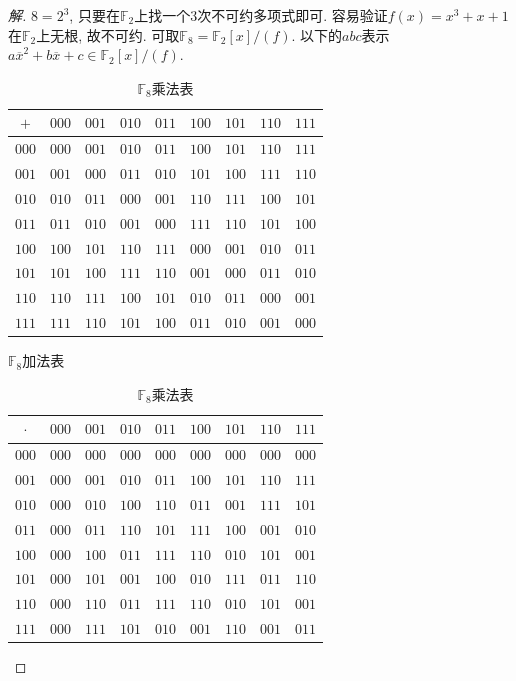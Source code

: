 \documentclass[12pt, a4paper, fontset=windows]{ctexart}
\newcommand{\F}{\mathbb{F}}
\newcommand{\cl}[1]{\overline{#1}} %
\newenvironment{solution}{\begin{proof}[解]}{\end{proof}}
\begin{document}
\begin{solution}
$8=2^3$, 只要在$\F_2$上找一个$3$次不可约多项式即可. 
容易验证$f(x)=x^3+x+1$在$\F_2$上无根, 故不可约. 
可取$\F_8=\F_2[x]/(f)$. 
以下的$abc$表示$a\cl{x}^2+b\cl{x}+c\in\F_2[x]/(f)$. 

\begin{table}[!htbp]
\footnotesize

\begin{minipage}{0.49\textwidth}
\begin{tabular}{c|c c c c c c c c}
$+$ & $000$ & $001$ & $010$ & $011$ & $100$ & $101$ & $110$ & $111$\\
\hline
$000$ & $000$ & $001$ & $010$ & $011$ & $100$ & $101$ & $110$ & $111$\\
$001$ & $001$ & $000$ & $011$ & $010$ & $101$ & $100$ & $111$ & $110$\\
$010$ & $010$ & $011$ & $000$ & $001$ & $110$ & $111$ & $100$ & $101$\\
$011$ & $011$ & $010$ & $001$ & $000$ & $111$ & $110$ & $101$ & $100$\\
$100$ & $100$ & $101$ & $110$ & $111$ & $000$ & $001$ & $010$ & $011$\\
$101$ & $101$ & $100$ & $111$ & $110$ & $001$ & $000$ & $011$ & $010$\\
$110$ & $110$ & $111$ & $100$ & $101$ & $010$ & $011$ & $000$ & $001$\\
$111$ & $111$ & $110$ & $101$ & $100$ & $011$ & $010$ & $001$ & $000$\\
\end{tabular}
\caption{$\F_8$加法表}
\end{minipage}
\begin{minipage}{0.49\textwidth}
\centering
\begin{tabular}{c|c c c c c c c c}
$\cdot$ & $000$ & $001$ & $010$ & $011$ & $100$ & $101$ & $110$ & $111$\\
\hline
$000$ & $000$ & $000$ & $000$ & $000$ & $000$ & $000$ & $000$ & $000$\\
$001$ & $000$ & $001$ & $010$ & $011$ & $100$ & $101$ & $110$ & $111$\\
$010$ & $000$ & $010$ & $100$ & $110$ & $011$ & $001$ & $111$ & $101$\\
$011$ & $000$ & $011$ & $110$ & $101$ & $111$ & $100$ & $001$ & $010$\\
$100$ & $000$ & $100$ & $011$ & $111$ & $110$ & $010$ & $101$ & $001$\\
$101$ & $000$ & $101$ & $001$ & $100$ & $010$ & $111$ & $011$ & $110$\\
$110$ & $000$ & $110$ & $011$ & $111$ & $110$ & $010$ & $101$ & $001$\\
$111$ & $000$ & $111$ & $101$ & $010$ & $001$ & $110$ & $001$ & $011$\\
\end{tabular}
\caption{$\F_8$乘法表}
\end{minipage}

\end{table}

\end{solution}
\end{document}
